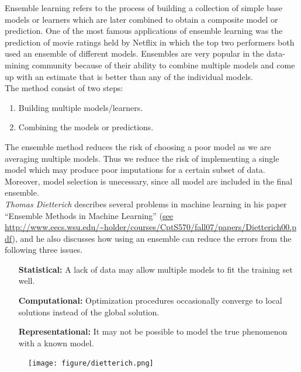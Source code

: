 \documentclass[nojss]{jss}
\begin{document}
Ensemble learning refers to the process of building a collection of
simple base models or learners which are later combined to obtain a
composite model or prediction.  One of the most famous applications of ensemble learning was the prediction of movie ratings held by Netflix in which the
top two performers both used an ensemble of different models.  Ensembles are very popular in the data-mining community because of their ability to combine multiple models and come up with an estimate that is better than any of the individual models.\\

The method consist of two steps:
\begin{enumerate}
  \item Building multiple models/learners.
  \item Combining the models or predictions.
\end{enumerate}

The ensemble method reduces the risk of choosing a poor model as we are averaging multiple models.  Thus we reduce the risk of implementing a single model which may produce poor imputations for a certain subset of data. Moreover, model selection is unecessary, since all model are included in the final ensemble.\\

\textit{Thomas Dietterich} describes several problems in machine learning in his paper ``Ensemble Methods in Machine Learning'' (\url{see http://www.eecs.wsu.edu/~holder/courses/CptS570/fall07/papers/Dietterich00.pdf}), and he also discusses how using an ensemble can reduce the errors from the following three issues.

\begin{itemize}
  \setlength{\itemindent}{1in}
  \item[\textbf{Statistical:}] A lack of data may allow multiple models to fit the training set well.
  \item[\textbf{Computational:}] Optimization procedures occasionally converge to local solutions instead of the global solution.
  \item[\textbf{Representational:}] It may not be possible to model the true phenomenon with a known model.
\end{itemize}

\begin{figure}[!ht]
  \centering
  \texttt{[image: figure/dietterich.png]}
\end{figure}
\end{document}
